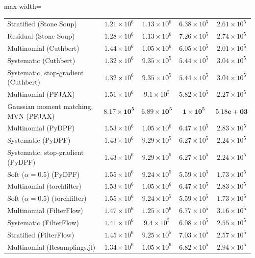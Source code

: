 \begin{table}[H]
\begin{adjustbox}{max width=\linewidth}
\begin{tabular}{lcccc}
Stratified (Stone Soup) & $1.21\times10^{6}$ & $1.13\times10^{6}$ & $6.38\times10^{5}$ & $2.61\times10^{5}$ \\
Residual (Stone Soup) & $1.28\times10^{6}$ & $1.13\times10^{6}$ & $7.26\times10^{5}$ & $2.74\times10^{5}$ \\
Multinomial (Cuthbert) & $1.44\times10^{6}$ & $1.05\times10^{6}$ & $6.05\times10^{5}$ & $2.01\times10^{5}$ \\
Systematic (Cuthbert) & $1.32\times10^{6}$ & $9.35\times10^{5}$ & $5.44\times10^{5}$ & $3.04\times10^{5}$ \\
Systematic, stop-gradient (Cuthbert) & $1.32\times10^{6}$ & $9.35\times10^{5}$ & $5.44\times10^{5}$ & $3.04\times10^{5}$ \\
Multinomial (PFJAX) & $1.51\times10^{6}$ & $9.1\times10^{5}$ & $5.82\times10^{5}$ & $2.27\times10^{5}$ \\
Gaussian moment matching, MVN (PFJAX) & $\mathbf{8.17\times10^{5}}$ & $\mathbf{6.89\times10^{5}}$ & $\mathbf{1\times10^{5}}$ & $\mathbf{5.18e+03}$ \\
Multinomial (PyDPF) & $1.53\times10^{6}$ & $1.05\times10^{6}$ & $6.47\times10^{5}$ & $2.83\times10^{5}$ \\
Systematic (PyDPF) & $1.43\times10^{6}$ & $9.29\times10^{5}$ & $6.27\times10^{5}$ & $2.24\times10^{5}$ \\
Systematic, stop-gradient (PyDPF) & $1.43\times10^{6}$ & $9.29\times10^{5}$ & $6.27\times10^{5}$ & $2.24\times10^{5}$ \\
Soft ($\alpha{=}0.5$) (PyDPF) & $1.55\times10^{6}$ & $9.24\times10^{5}$ & $5.59\times10^{5}$ & $1.73\times10^{5}$ \\
Multinomial (torchfilter) & $1.53\times10^{6}$ & $1.05\times10^{6}$ & $6.47\times10^{5}$ & $2.83\times10^{5}$ \\
Soft ($\alpha{=}0.5$) (torchfilter) & $1.55\times10^{6}$ & $9.24\times10^{5}$ & $5.59\times10^{5}$ & $1.73\times10^{5}$ \\
Multinomial (FilterFlow) & $1.47\times10^{6}$ & $1.25\times10^{6}$ & $6.77\times10^{5}$ & $3.16\times10^{5}$ \\
Systematic (FilterFlow) & $1.41\times10^{6}$ & $9.4\times10^{5}$ & $6.08\times10^{5}$ & $2.55\times10^{5}$ \\
Stratified (FilterFlow) & $1.45\times10^{6}$ & $9.25\times10^{5}$ & $7.03\times10^{5}$ & $2.57\times10^{5}$ \\
Multinomial (Resamplings.jl) & $1.34\times10^{6}$ & $1.05\times10^{6}$ & $6.82\times10^{5}$ & $2.94\times10^{5}$ \\

\end{tabular}
\end{adjustbox}
\end{table}
